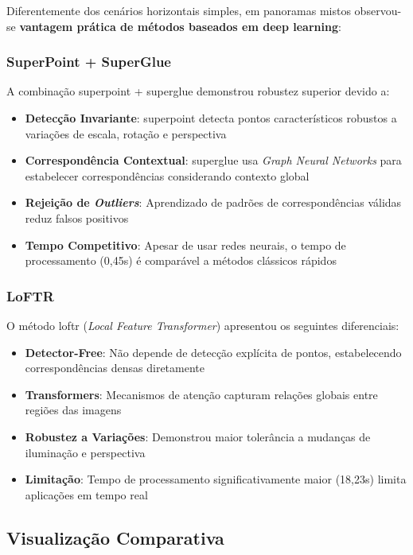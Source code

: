 Diferentemente dos cenários horizontais simples, em panoramas mistos observou-se \textbf{vantagem prática de métodos baseados em deep learning}:

\subsubsection{SuperPoint + SuperGlue}

A combinação \gls{superpoint} + \gls{superglue} demonstrou robustez superior devido a:

\begin{itemize}
    \item \textbf{Detecção Invariante}: \gls{superpoint} detecta pontos característicos robustos a variações de escala, rotação e perspectiva
    \item \textbf{Correspondência Contextual}: \gls{superglue} usa \textit{Graph Neural Networks} para estabelecer correspondências considerando contexto global
    \item \textbf{Rejeição de \textit{Outliers}}: Aprendizado de padrões de correspondências válidas reduz falsos positivos
    \item \textbf{Tempo Competitivo}: Apesar de usar redes neurais, o tempo de processamento (0,45s) é comparável a métodos clássicos rápidos
\end{itemize}

\subsubsection{LoFTR}

O método \gls{loftr} (\textit{Local Feature Transformer}) apresentou os seguintes diferenciais:

\begin{itemize}
    \item \textbf{Detector-Free}: Não depende de detecção explícita de pontos, estabelecendo correspondências densas diretamente
    \item \textbf{Transformers}: Mecanismos de atenção capturam relações globais entre regiões das imagens
    \item \textbf{Robustez a Variações}: Demonstrou maior tolerância a mudanças de iluminação e perspectiva
    \item \textbf{Limitação}: Tempo de processamento significativamente maior (18,23s) limita aplicações em tempo real
\end{itemize}

\subsection{Visualização Comparativa}

